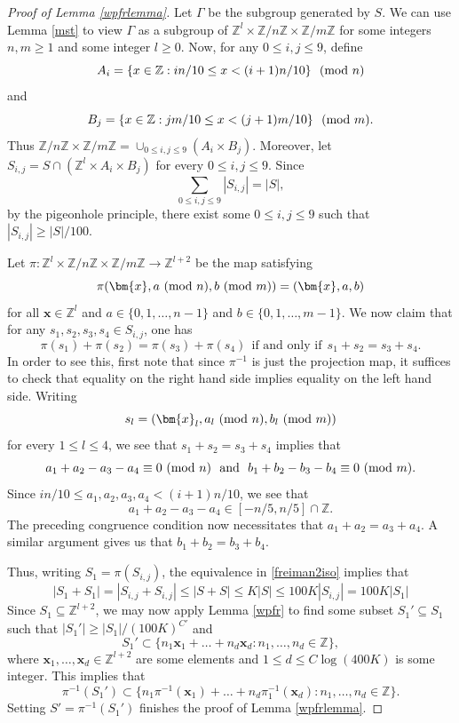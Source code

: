 \documentclass[12pt, reqno]{amsart}
\renewcommand{\vec}[1]{\mathbf{#1}}
\renewcommand{\vec}{\bm}
\theoremstyle{remark}
\theoremstyle{definition}
\numberwithin{equation}{section}
\begin{document}
\begin{proof}[Proof of Lemma \ref{wpfrlemma}]
    Let $\Gamma$ be the subgroup generated by $S$. We can use Lemma \ref{mst} to view $\Gamma$ as a subgroup of $\mathbb{Z}^l \times \mathbb{Z}/n\mathbb{Z} \times \mathbb{Z}/ m \mathbb{Z}$ for some integers $n,m \geq 1$ and some integer $l \geq 0.$  Now, for any $0\leq i, j \leq 9$, define
    \[ A_i = \{ x \in \mathbb{Z} : in/10 \leq x < (i+1)n/10 \} \ \ ({\rm mod} \ n)  \] 
    and
    \[ B_j = \{ x \in \mathbb{Z} : jm /10 \leq x < (j+1)m/10 \} \ \ ({\rm mod} \ m) . \]
    Thus $\mathbb{Z}/n \mathbb{Z} \times \mathbb{Z}/m\mathbb{Z} = \cup_{0 \leq i,j \leq 9} (A_{i} \times B_j)$. Moreover, let $S_{i,j} = S \cap (\mathbb{Z}^l \times A_i \times B_j)$ for every $0 \leq i,j \leq 9$. Since
    \[ \sum_{0 \leq i,j \leq 9} |S_{i,j}|  = |S|,\]
    by the pigeonhole principle, there exist some $0 \leq i,j \leq 9$ such that $|S_{i,j}| \geq |S|/100$.

    Let $\pi : \mathbb{Z}^l \times \mathbb{Z}/n \mathbb{Z} \times \mathbb{Z}/m \mathbb{Z} \to \mathbb{Z}^{l+2}$ be the map satisfying
    \[ \pi(\vec{x}, a \ ({\rm mod} \ n),b\ ({\rm mod} \ m)) = (\vec{x},a,b) \]
    for all $\vec{x} \in \mathbb{Z}^l$ and $a \in \{0,1,\dots, n-1\}$ and $b \in \{0,1,\dots, m-1\}$. We now claim that for any $s_1, s_2,s_3,s_4 \in S_{i,j}$, one has
    \begin{equation} \label{freiman2iso}
        \pi(s_1) + \pi(s_2) = \pi(s_3) + \pi(s_4) \ \ \text{if and only if} \ \  s_1 + s_2 = s_3 + s_4. 
    \end{equation}
    In order to see this, first note that since $\pi^{-1}$ is just the projection map, it suffices to check that equality on the right hand side implies equality on the left hand side. Writing 
    \[ s_l = (\vec{x}_l, a_l \ ({\rm mod} \ n),b_l\ ({\rm mod} \ m)) \]
    for every $1 \leq l \leq 4$, we see that $s_1 + s_2 = s_3 + s_4$ implies that 
    \[ a_1 + a_2 - a_3 - a_4  \equiv 0\ ({\rm mod} \ n) \ \ \text{and} \ \ b_1 + b_2 - b_3 - b_4 \equiv 0 \ ({\rm mod} \ m). \]
    Since $in/10 \leq a_1, a_2, a_3, a_4 < (i+1)n/10$, we see that 
    \[ a_1 + a_2 - a_3 - a_4 \in [-n/5, n/5]\cap \mathbb{Z}.\] The preceding congruence condition now necessitates that $a_1 + a_2 = a_3 + a_4$. A similar argument gives us that $b_1 + b_2 = b_3 + b_4$.

    
    Thus, writing $S_1 = \pi(S_{i,j})$, the equivalence in \eqref{freiman2iso} implies that
    \[ |S_1 + S_1| = |S_{i,j} + S_{i,j}| \leq |S +S| \leq K|S| \leq 100K |S_{i,j}| = 100K |S_1| \]
    Since $S_1 \subseteq \mathbb{Z}^{l+2}$, we may now apply Lemma \ref{wpfr} to find some subset $S_1' \subseteq S_1$ such that $|S_1'| \geq |S_1|/(100K)^{C'}$ and 
    \[ S_1' \subset \{ n_1 \vec{x}_1 + \dots + n_d \vec{x}_d : n_1, \dots, n_d \in \mathbb{Z}\},\]
    where $\vec{x}_1, \dots, \vec{x}_d \in \mathbb{Z}^{l+2}$ are some elements and $1\leq d \leq C \log (400K)$ is some integer. This implies that
    \[ \pi^{-1}(S_1') \subset \{ n_1 \pi^{-1}(\vec{x}_1) + \dots + n_d \pi_1^{-1}(\vec{x}_d) : n_1, \dots, n_d \in \mathbb{Z} \}. \]
    Setting $S' = \pi^{-1}(S_1')$ finishes the proof of Lemma \ref{wpfrlemma}.
\end{proof}
\end{document}
